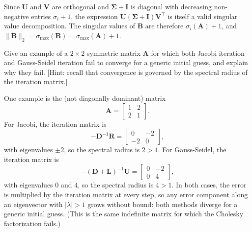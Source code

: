 \begin{solution}
    Since $\mathbf{U}$ and $\mathbf{V}$ are orthogonal and $\boldsymbol{\Sigma} + \mathbf{I}$ is diagonal with decreasing non-negative entries $\sigma_i + 1$, the expression $\mathbf{U}(\boldsymbol{\Sigma} + \mathbf{I})\mathbf{V}^\top$ is itself a valid singular value decomposition. The singular values of $\mathbf{B}$ are therefore $\sigma_i(\mathbf{A}) + 1$, and $\|\mathbf{B}\|_2 = \sigma_{\max}(\mathbf{B}) = \sigma_{\max}(\mathbf{A}) + 1$.
\end{solution}

\begin{exercise} %
    Give an example of a $2 \times 2$ symmetric matrix $\mathbf{A}$ for which both Jacobi iteration and Gauss-Seidel iteration fail to converge for a generic initial guess, and explain why they fail. [Hint: recall that convergence is governed by the spectral radius of the iteration matrix.]
\end{exercise}

\begin{solution}
    One example is the (not diagonally dominant) matrix
    \begin{equation*}
        \mathbf{A} = \begin{bmatrix} 1 & 2 \\ 2 & 1 \end{bmatrix}.
    \end{equation*}
    For Jacobi, the iteration matrix is
    \begin{equation*}
        -\mathbf{D}^{-1}\mathbf{R} = \begin{bmatrix} 0 & -2 \\ -2 & 0 \end{bmatrix},
    \end{equation*}
    with eigenvalues $\pm 2$, so the spectral radius is $2 > 1$.
    For Gauss-Seidel, the iteration matrix is
    \begin{equation*}
        -(\mathbf{D} + \mathbf{L})^{-1}\mathbf{U} = \begin{bmatrix} 0 & -2 \\ 0 & 4 \end{bmatrix},
    \end{equation*}
    with eigenvalues $0$ and $4$, so the spectral radius is $4 > 1$.
    In both cases, the error is multiplied by the iteration matrix at every step, so any error component along an eigenvector with $|\lambda| > 1$ grows without bound: both methods diverge for a generic initial guess.
    (This is the same indefinite matrix for which the Cholesky factorization fails.)
\end{solution}


